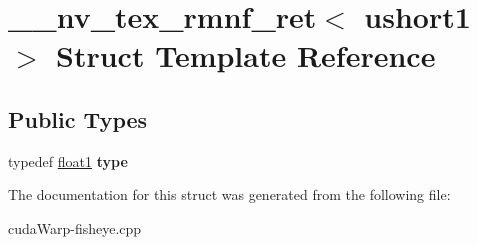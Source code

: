 \hypertarget{struct____nv__tex__rmnf__ret_3_01ushort1_01_4}{}\section{\+\_\+\+\_\+nv\+\_\+tex\+\_\+rmnf\+\_\+ret$<$ ushort1 $>$ Struct Template Reference}
\label{struct____nv__tex__rmnf__ret_3_01ushort1_01_4}
\subsection*{Public Types}
\begin{DoxyCompactItemize}
\item 
typedef \hyperlink{structfloat1}{float1} {\bfseries type}\hypertarget{struct____nv__tex__rmnf__ret_3_01ushort1_01_4_aa70fe94fc6f5ea7647503058ad65d395}{}\label{struct____nv__tex__rmnf__ret_3_01ushort1_01_4_aa70fe94fc6f5ea7647503058ad65d395}

\end{DoxyCompactItemize}


The documentation for this struct was generated from the following file\+:\begin{DoxyCompactItemize}
\item 
cuda\+Warp-\/fisheye.\+cpp\end{DoxyCompactItemize}
